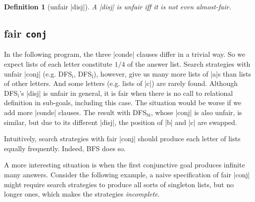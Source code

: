 \documentclass[format=acmlarge, review=true, authordraft=true]{acmart}
\newtheorem{defn}{Definition}[section]
\begin{document}
\begin{defn}[unfair \scheme|disj|]
A \scheme|disj| is unfair iff it is not even almost-fair.
\end{defn}


\subsection{fair \texttt{conj}}

In the following program, the three \scheme|conde| clauses differ in a trivial way. So 
we expect lists of each letter constitute $1/4$ of the answer list. Search 
strategies with unfair \scheme|conj| (e.g. DFS$_\textrm{i}$, DFS$_\textrm{f}$), 
however, give us many more lists of \scheme|a|s than lists of other letters. 
And some letters (e.g. lists 
of \scheme|c|) are rarely found. Although DFS$_\textrm{i}$'s \scheme|disj| is unfair in general, 
it is fair when there is no call to relational definition in sub-goals, 
including this case. The situation would be worse if we add more \scheme|conde| 
clauses. The result with DFS$_\textrm{bi}$, whose \scheme|conj| is also unfair, is similar, but 
due to its different \scheme|disj|, the position of \scheme|b| and \scheme|c| are 
swapped. 

\begin{center}
	\begin{schemeregion}
	\end{schemeregion}
\end{center}

\begin{center}
	\begin{schemeregion}
	\end{schemeregion}
\end{center}

Intuitively, search strategies with fair \scheme|conj| should produce each letter of 
lists equally frequently. Indeed, BFS does so.

\begin{center}
	\begin{schemeregion}
	\end{schemeregion}
\end{center}

A more interesting situation is when the first conjunctive goal produces 
infinite many answers. Consider the following example, a naive specification of 
fair \scheme|conj| might require search strategies to produce all sorts of singleton 
lists, but no longer ones, which makes the strategies \emph{incomplete}. 
\end{document}
